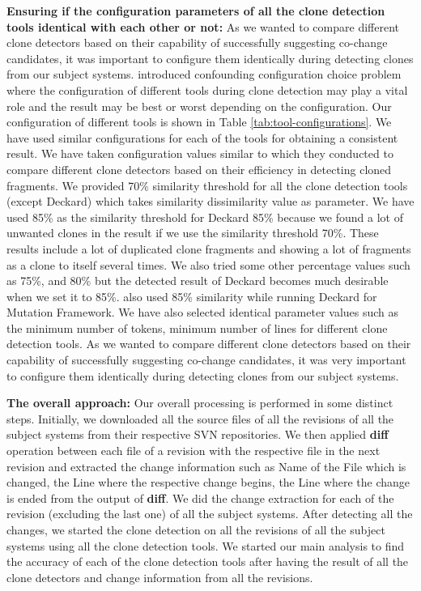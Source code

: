 \documentclass[review]{elsarticle}
\begin{document}
\vspace{1mm}
\textbf{Ensuring if the configuration parameters of all the clone detection tools identical with each other or not:} As we wanted to compare different clone detectors based on their capability of successfully suggesting co-change candidates, it was important to configure them identically during detecting clones from our subject systems. \citet{Wang-2013-SBC-2491411-2491420} introduced confounding configuration choice problem where the configuration of different tools during clone detection may play a vital role and the result may be best or worst depending on the configuration. Our configuration of different tools is shown in Table \ref{tab:tool-configurations}. We have used similar configurations for each of the tools for obtaining a consistent result. We have taken configuration values similar to \citet{jeff-evaluating} which they conducted to compare different clone detectors based on their efficiency in detecting cloned fragments. We provided 70\% similarity threshold for all the clone detection tools (except Deckard) which takes similarity dissimilarity value as parameter. We have used 85\% as the similarity threshold for Deckard 85\% because we found a lot of unwanted clones in the result if we use the similarity threshold 70\%. These results include a lot of duplicated clone fragments and showing a lot of fragments as a clone to itself several times. We also tried some other percentage values such as 75\%, and 80\% but the detected result of Deckard becomes much desirable when we set it to 85\%. \citet{jeff-evaluating} also used 85\% similarity while running Deckard for Mutation Framework. We have also selected identical parameter values such as the minimum number of tokens, minimum number of lines for different clone detection tools. As we wanted to compare different clone detectors based on their capability of successfully suggesting co-change candidates, it was very important to configure them identically during detecting clones from our subject systems.

\textbf{The overall approach:} Our overall processing is performed in some distinct steps.  Initially, we downloaded all the source files of all the revisions of all the subject systems from their respective SVN repositories. We then applied \textbf{diff} operation between each file of a revision with the respective file in the next revision and extracted the change information such as Name of the File which is changed, the Line where the respective change begins, the Line where the change is ended from the output of \textbf{diff}. We did the change extraction for each of the revision (excluding the last one) of all the subject systems. After detecting all the changes, we started the clone detection on all the revisions of all the subject systems using all the clone detection tools. We started our main analysis to find the accuracy of each of the clone detection tools after having the result of all the clone detectors and change information from all the revisions. 
\end{document}
